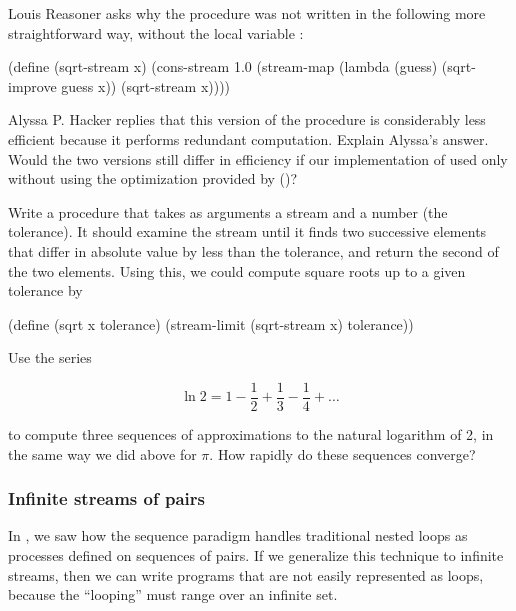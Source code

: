 \begin{exerciseGroup}
\label{Exercise 3.63}
 Louis Reasoner asks why the
 procedure was not written in the following more
straightforward way, without the local variable :

\begin{codeBlock}
(define (sqrt-stream x)
  (cons-stream 1.0 (stream-map
                    (lambda (guess)
                      (sqrt-improve guess x))
                    (sqrt-stream x))))
\end{codeBlock}

Alyssa P. Hacker replies that this version of the procedure is considerably
less efficient because it performs redundant computation.  Explain Alyssa's
answer.  Would the two versions still differ in efficiency if our
implementation of  used only  without
using the optimization provided by  ()?

\label{Exercise 3.64}
 Write a procedure
 that takes as arguments a stream and a number (the
tolerance).  It should examine the stream until it finds two successive
elements that differ in absolute value by less than the tolerance, and return
the second of the two elements.  Using this, we could compute square roots up
to a given tolerance by

\begin{codeBlock}
(define (sqrt x tolerance)
  (stream-limit (sqrt-stream x) tolerance))
\end{codeBlock}

\label{Exercise 3.65}
 Use the series

$$ \ln 2 = 1 - \frac{1}{2} + \frac{1}{3} - \frac{1}{4} + \dots $$

\noindent
to compute three sequences of approximations to the natural logarithm of 2, in
the same way we did above for \( \pi \).  How rapidly do these sequences
converge?
\end{exerciseGroup}

\subsubsection*{Infinite streams of pairs}

In , we saw how the sequence paradigm handles traditional
nested loops as processes defined on sequences of pairs.  If we generalize this
technique to infinite streams, then we can write programs that are not easily
represented as loops, because the ``looping'' must range over an infinite set.

